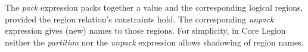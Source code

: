 The {\em pack} expression packs together a value and the corresponding logical regions,
provided the region relation's constraints hold.  The
corresponding {\em unpack} expression gives (new) names to those regions.  For simplicity, in Core Legion neither the 
{\em partition} nor the {\em unpack} expression allows shadowing of region names.

\begin{comment}
\begin{figure*}
\centering{
\framebox{$\typeenv{bv}{bool}$}
\framebox{$\typeenv{iv}{int}$}
\finfrule
{\begin{array}{l}
\typeenvx e_1 : T_1 \\
\typeenvx e_2 : T_2
\end{array}}
{\typeenvx \langle e_1, e_2 \rangle : \langle T_1, T_2 \rangle}
\finfrule{\typeenvx e : \langle T_1,T_2 \rangle}{\typeenvx e\text{.1}\ : T_1}
\finfrule{\typeenvx e : \langle T_1,T_2 \rangle}{\typeenvx e\text{.2}\ : T_2}
\finfrule{\Gamma(id) = T}{\typeenvx id : T}
\framebox{$\typeenvx \text{null }T@r : T@r$}
\framebox{$\typeenvx \text{new }T@r : T@r$}
\finfrule{\typeenvx e : T@(\oton{r})}{\typeenvx \text{isnull}(e) : bool}
\finfrule
{\begin{array}{l}
\typeenvx e : T@(r'_1, \ldots r'_k) \\
\forall i. \exists j, r'_i \leq r_j \in \Omega^* \\
\end{array}}
{\typeenvx upregion(e,\oton{r}) : T@(\oton{r})}
\finfrule
{\begin{array}{l}
\typeenvx e : T@(r'_1, \ldots r'_k) \\
\forall j. \exists i, r_j \leq r'_i \in \Omega^* \\
\end{array}}
{\typeenvx downregion(e,\oton{r}) : T@(\oton{r})}
\finfrule
{\begin{array}{l}
\typeenvx e_1 : T@(\oton{r}) \\
\forall i, reads(r_i) \in \Phi^*\end{array}}
{\typeenvx \text{read}(e_1) : T}
\finfrule
{\begin{array}{l}
\typeenvx e_1 : T@(\oton{r}) \\
\typeenvx e_2 : T \\
\forall i, writes(r_i) \in \Phi^*
\end{array}}
{\typeenvx \text{write}(e_1, e_2) : T@(\oton{r})}
\finfrule
{\begin{array}{l}
\Gamma(id) = (T_1, T_2), \emptyset, \emptyset \rightarrow T_1 \\

\end{comment}
